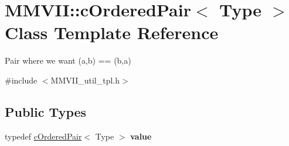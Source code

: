 \hypertarget{classMMVII_1_1cOrderedPair}{}\section{M\+M\+V\+II\+:\+:c\+Ordered\+Pair$<$ Type $>$ Class Template Reference}
\label{classMMVII_1_1cOrderedPair}


Pair where we want (a,b) == (b,a)  




{\ttfamily \#include $<$M\+M\+V\+I\+I\+\_\+util\+\_\+tpl.\+h$>$}

\subsection*{Public Types}
\begin{DoxyCompactItemize}
\item 
typedef \hyperlink{classMMVII_1_1cOrderedPair}{c\+Ordered\+Pair}$<$ Type $>$ {\bfseries value}\hypertarget{classMMVII_1_1cOrderedPair_a4e451a42d1da9bbfc5a35218c7f78a8a}{}\label{classMMVII_1_1cOrderedPair_a4e451a42d1da9bbfc5a35218c7f78a8a}

\end{DoxyCompactItemize}
